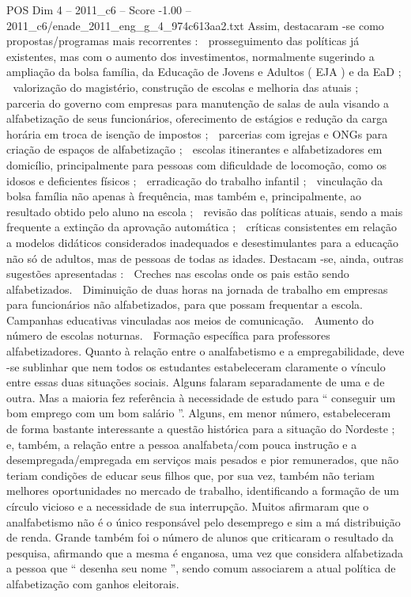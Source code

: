 \begin{textsample}{POS Dim 4 – 2011\_c6 – Score -1.00 – 2011\_c6/enade\_2011\_eng\_g\_4\_974c613aa2.txt}
Assim, destacaram -se como propostas/programas mais recorrentes :  prosseguimento das políticas já existentes, mas com o aumento dos investimentos, normalmente sugerindo a ampliação da bolsa família, da Educação de Jovens e Adultos ( EJA ) e da EaD ;  valorização do magistério, construção de escolas e melhoria das atuais ;  parceria do governo com empresas para manutenção de salas de aula visando a alfabetização de seus funcionários, oferecimento de estágios e redução da carga horária em troca de isenção de impostos ;  parcerias com igrejas e ONGs para criação de espaços de alfabetização ;  escolas itinerantes e alfabetizadores em domicílio, principalmente para pessoas com dificuldade de locomoção, como os idosos e deficientes físicos ;  erradicação do trabalho infantil ;  vinculação da bolsa família não apenas à frequência, mas também e, principalmente, ao resultado obtido pelo aluno na escola ;  revisão das políticas atuais, sendo a mais frequente a extinção da aprovação automática ;  críticas consistentes em relação a modelos didáticos considerados inadequados e desestimulantes para a educação não só de adultos, mas de pessoas de todas as idades.
Destacam -se, ainda, outras sugestões apresentadas :  Creches nas escolas onde os pais estão sendo alfabetizados.  Diminuição de duas horas na jornada de trabalho em empresas para funcionários não alfabetizados, para que possam frequentar a escola.  Campanhas educativas vinculadas aos meios de comunicação.  Aumento do número de escolas noturnas.  Formação específica para professores alfabetizadores.
Quanto à relação entre o analfabetismo e a empregabilidade, deve -se sublinhar que nem todos os estudantes estabeleceram claramente o vínculo entre essas duas situações sociais.
Alguns falaram separadamente de uma e de outra.
Mas a maioria fez referência à necessidade de estudo para “ conseguir um bom emprego com um bom salário ”.
Alguns, em menor número, estabeleceram de forma bastante interessante a questão histórica para a situação do Nordeste ; e, também, a relação entre a pessoa analfabeta/com pouca instrução e a desempregada/empregada em serviços mais pesados e pior remunerados, que não teriam condições de educar seus filhos que, por sua vez, também não teriam melhores oportunidades no mercado de trabalho, identificando a formação de um círculo vicioso e a necessidade de sua interrupção.
Muitos afirmaram que o analfabetismo não é o único responsável pelo desemprego e sim a má distribuição de renda.
Grande também foi o número de alunos que criticaram o resultado da pesquisa, afirmando que a mesma é enganosa, uma vez que considera alfabetizada a pessoa que “ desenha seu nome ”, sendo comum associarem a atual política de alfabetização com ganhos eleitorais.

\end{textsample}
